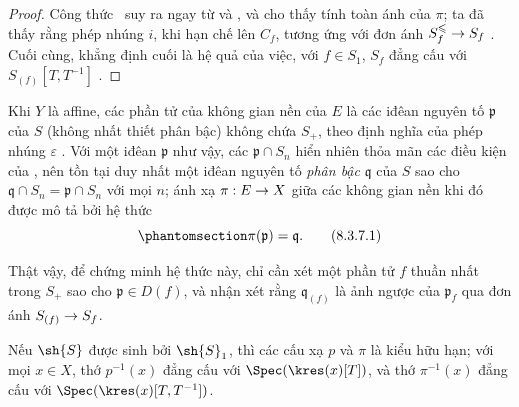 \documentclass[oneside,10pt]{amsart}
\makeatletter
\renewcommand{\leq}{\leqslant}
\newcommand{\ega@arrow}[2]{\mathchoice{#1}{#2}{#2}{#2}}
\renewcommand{\to}{\ega@arrow{\longrightarrow}{\rightarrow}}
\newcommand{\oldpage}[2][]{\marginnote{\normalfont\footnotesize\textbf{#1}~|~#2}\ignorespaces}
\let\EGAOriginalLabel\label
\renewcommand{\label}[1]{\phantomsection\EGAOriginalLabel{#1}}
\makeatother
\begin{document}
\begin{proof}
Công thức~ suy ra ngay từ  và , và cho thấy tính toàn ánh của $\pi$;
ta đã thấy rằng phép nhúng $i$, khi hạn chế lên $C_f$, tương ứng
\oldpage[II]{166}
với đơn ánh $S_f^\leq\to S_f$ .
Cuối cùng, khẳng định cuối là hệ quả của việc, với $f\in S_1$, $S_f$ đẳng cấu với $S_{(f)}[T,T^{-1}]$ .
\end{proof}
\begin{remark}[8.3.7]
\label{II.8.3.7}
Khi $Y$ là affine, các phần tử của không gian nền của $E$ là các iđêan nguyên tố $\mathfrak{p}$ của $S$ (không nhất thiết phân bậc) không chứa $S_+$, theo định nghĩa của phép nhúng $\varepsilon$ .
Với một iđêan $\mathfrak{p}$ như vậy, các $\mathfrak{p}\cap S_n$ hiển nhiên thỏa mãn các điều kiện của , nên tồn tại duy nhất một iđêan nguyên tố \emph{phân bậc} $\mathfrak{q}$ của $S$ sao cho $\mathfrak{q}\cap S_n=\mathfrak{p}\cap S_n$ với mọi $n$;
ánh xạ $\pi:E\to X$ giữa các không gian nền khi đó được mô tả bởi hệ thức
\[
\label{II.8.3.7.1}
  \pi(\mathfrak{p}) = \mathfrak{q}.
\tag{8.3.7.1}
\]

Thật vậy, để chứng minh hệ thức này, chỉ cần xét một phần tử $f$ thuần nhất trong $S_+$ sao cho $\mathfrak{p}\in D(f)$, và nhận xét rằng $\mathfrak{q}_{(f)}$ là ảnh ngược của $\mathfrak{p}_f$ qua đơn ánh $S_{(f)}\to S_f$.
\end{remark}

\begin{corollary}[8.3.8]
\label{II.8.3.8}
Nếu $\sh{S}$ được sinh bởi $\sh{S}_1$, thì các cấu xạ $p$ và $\pi$ là kiểu hữu hạn;
với mọi $x\in X$, thớ $p^{-1}(x)$ đẳng cấu với $\Spec(\kres(x)[T])$, và thớ $\pi^{-1}(x)$ đẳng cấu với $\Spec(\kres(x)[T,T^{-1}])$.
\end{corollary}
\end{document}
